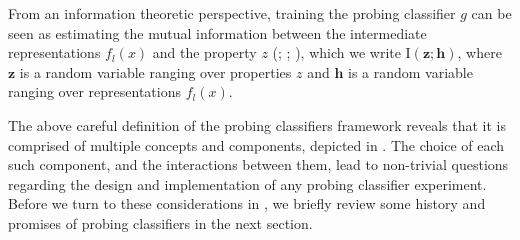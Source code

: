 \documentclass[discussion]{clv3}
\begin{document}
From an information theoretic perspective, training the probing classifier $g$ can be seen as estimating the mutual information between the intermediate representations $f_l(x)$ and the property $z$ (\citealt[p. 42]{belinkov:2018:phdthesis}; \citealt{pimentel-etal-2020-information}; \citealt{zhu-rudzicz-2020-information}), which we write $\mathrm{I}(\mathbf{z} ; \mathbf{h})$, where  $\mathbf{z}$ is a random variable ranging over properties $z$ and $\mathbf{h}$ is a random variable ranging over representations $f_l(x)$.  

The above careful definition of the probing classifiers framework reveals that it is comprised of multiple concepts and components, depicted in .  The choice of each such component, and the interactions between them, lead to non-trivial questions regarding the design and implementation of any probing classifier experiment. Before we turn to these considerations   in , we briefly review some history and promises of probing classifiers in the next section. 
\end{document}
